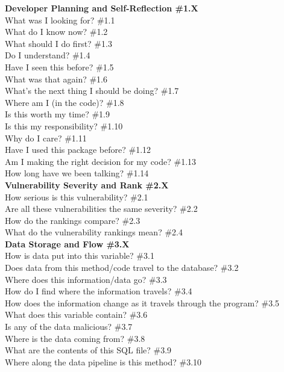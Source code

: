 \documentclass[10pt,journal,compsoc]{IEEEtran}
\begin{document}
\noindent\textbf{Developer Planning and Self-Reflection \#1.X} \\
	What was I looking for?  \#1.1 \\
	What do I know now? \#1.2 \\
	What should I do first? \#1.3 \\
	Do I understand? \#1.4 \\
	Have I seen this before?  \#1.5 \\
	What was that again? \#1.6 \\
	What's the next thing I should be doing?  \#1.7 \\
	Where am I (in the code)?  \#1.8 \\
	Is this worth my time? \#1.9 \\
	Is this my responsibility?  \#1.10 \\
	Why do I care? \#1.11 \\
	Have I used this package before? \#1.12 \\
	Am I making the right decision for my code? \#1.13 \\
	How long have we been talking? \#1.14 \\
\textbf{Vulnerability Severity and Rank \#2.X} \\
	How serious is this vulnerability? \#2.1 \\
	Are all these vulnerabilities the same severity? \#2.2 \\
	How do the rankings compare? \#2.3 \\
	What do the vulnerability rankings mean? \#2.4 \\
\textbf{Data Storage and Flow \#3.X} \\
	How is data put into this variable? \#3.1 \\
	Does data from this method/code travel to the database? \#3.2 \\
	Where does this information/data go? \#3.3 \\
	How do I find where the information travels? \#3.4 \\
	How does the information change as it travels through the program? \#3.5 \\
	What does this variable contain? \#3.6 \\
	Is any of the data malicious?  \#3.7 \\
	Where is the data coming from? \#3.8 \\
	What are the contents of this SQL file? \#3.9 \\
	Where along the data pipeline is this method? \#3.10 \\
\end{document}

